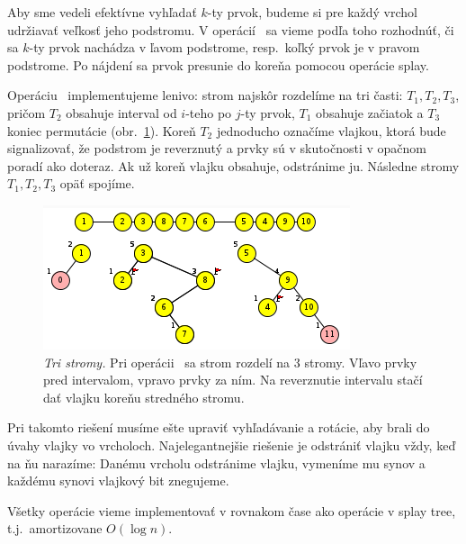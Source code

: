 
Aby sme vedeli efektívne vyhľadať $k$-ty prvok, budeme si pre každý vrchol udržiavať veľkosť jeho 
podstromu. V operácií \find\ sa vieme podľa toho rozhodnúť, či sa $k$-ty prvok nachádza v ľavom podstrome, 
resp.\ koľký prvok je v pravom podstrome. Po nájdení sa prvok presunie do koreňa pomocou operácie splay. 

Operáciu \reverse\ implementujeme lenivo: 
strom najskôr rozdelíme na tri časti: $T_1,T_2,T_3$, pričom $T_2$ obsahuje interval od $i$-teho 
po $j$-ty prvok, $T_1$ obsahuje začiatok a $T_3$ koniec permutácie (obr.~\ref{img:rev2}). 
Koreň $T_2$ jednoducho označíme vlajkou, ktorá bude signalizovať, že podstrom je reverznutý a 
prvky sú v skutočnosti v opačnom poradí ako doteraz. Ak už koreň vlajku obsahuje, odstránime ju. 
Následne stromy $T_1,T_2,T_3$ opäť spojíme.


\begin{figure}
\includegraphics[width=\columnwidth]{obrazky/rev3trees.png}
\caption{\emph{Tri stromy.} Pri operácii \reverse\ sa strom rozdelí na 3 stromy. 
Vľavo prvky pred intervalom, vpravo prvky za ním. 
Na reverznutie intervalu stačí dať vlajku koreňu stredného stromu.}
\label{img:rev2}
\end{figure}

Pri takomto riešení musíme ešte upraviť vyhľadávanie a rotácie, aby brali do úvahy vlajky vo vrcholoch.
Najelegantnejšie riešenie je odstrániť vlajku vždy, keď na ňu narazíme:
Danému vrcholu odstránime vlajku, vymeníme mu synov a každému synovi vlajkový bit znegujeme.

Všetky operácie vieme implementovať v rovnakom čase ako operácie v splay tree, t.j.\ amortizovane $O(\log n)$.

